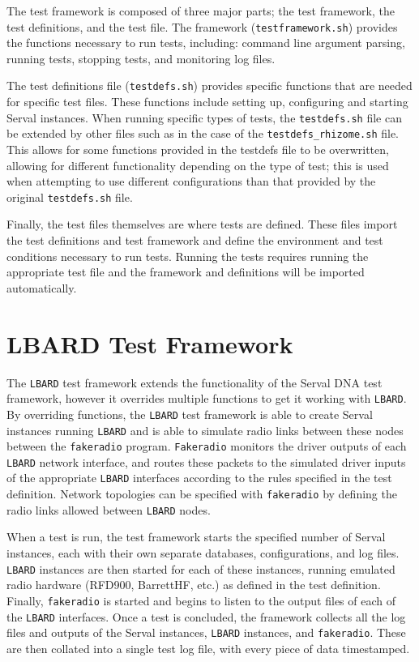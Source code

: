 The test framework is composed of three major parts; the test framework, the test definitions, and the test file.
The framework (\texttt{testframework.sh}) provides the functions necessary to run tests, including: command line argument parsing, running tests, stopping tests, and monitoring log files. 

The test definitions file (\texttt{testdefs.sh}) provides specific functions that are needed for specific test files.
These functions include setting up, configuring and starting Serval instances.
When running specific types of tests, the \texttt{testdefs.sh} file can be extended by other files such as in the case of the \texttt{testdefs\_rhizome.sh} file. 
This allows for some functions provided in the testdefs file to be overwritten, allowing for different functionality depending on the type of test; this is used when attempting to use different configurations than that provided by the original \texttt{testdefs.sh} file.

Finally, the test files themselves are where tests are defined. 
These files import the test definitions and test framework and define the environment and test conditions necessary to run tests. 
Running the tests requires running the appropriate test file and the framework and definitions will be imported automatically.

\section{LBARD Test Framework}
The \texttt{LBARD} test framework extends the functionality of the Serval DNA test framework, however it overrides multiple functions to get it working with \texttt{LBARD}.
By overriding functions, the \texttt{LBARD} test framework is able to create Serval instances running \texttt{LBARD} and is able to simulate radio links between these nodes between the \texttt{fakeradio} program.
\texttt{Fakeradio} monitors the driver outputs of each \texttt{LBARD} network interface, and routes these packets to the simulated driver inputs of the appropriate \texttt{LBARD} interfaces according to the rules specified in the test definition.
Network topologies can be specified with \texttt{fakeradio} by defining the radio links allowed between \texttt{LBARD} nodes.

When a test is run, the test framework starts the specified number of Serval instances, each with their own separate databases, configurations, and log files.
\texttt{LBARD} instances are then started for each of these instances, running emulated radio hardware (RFD900, BarrettHF, etc.) as defined in the test definition.
Finally, \texttt{fakeradio} is started and begins to listen to the output files of each of the \texttt{LBARD} interfaces.
Once a test is concluded, the framework collects all the log files and outputs of the Serval instances, \texttt{LBARD} instances, and \texttt{fakeradio}.
These are then collated into a single test log file, with every piece of data timestamped.

